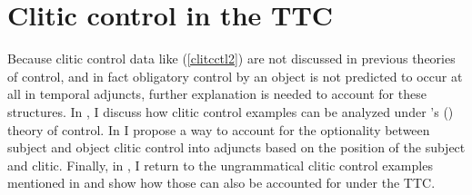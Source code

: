 \documentclass[output=paper,colorlinks,citecolor=brown]{langscibook}
\begin{document}
\section{Clitic control in the TTC} \label{Section 4}
\largerpage[-1]
Because clitic control data like (\ref{clitcctl2}) are not discussed in previous theories of control, and in fact obligatory control by an object is not predicted to occur at all in temporal adjuncts, further explanation is needed to account for these structures. In , I discuss how clitic control examples can be analyzed under \citeauthor{landau2015}'s (\citeyear{landau2015}) theory of control. In  I propose a way to account for the optionality between subject and object clitic control into adjuncts based on the position of the subject and clitic. Finally, in , I return to the ungrammatical clitic control examples mentioned in  and show how those can also be accounted for under the TTC.
\end{document}
